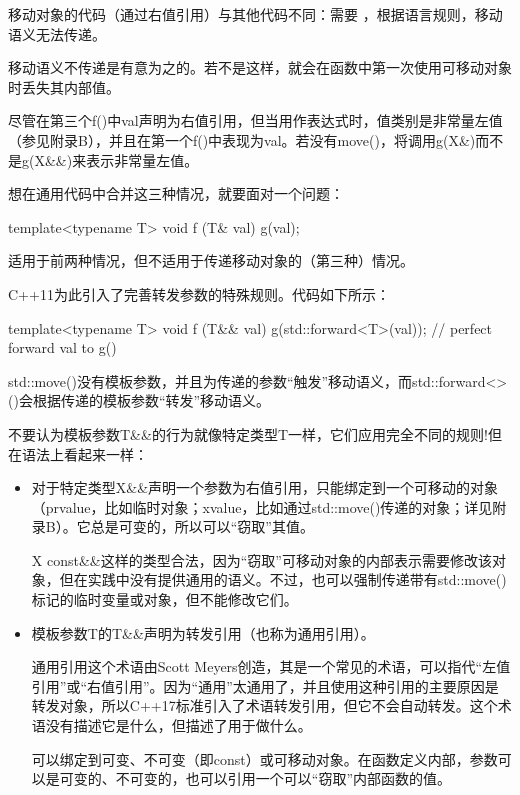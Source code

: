 移动对象的代码（通过右值引用）与其他代码不同：需要 ，根据语言规则，移动语义无法传递。

\begin{notice}
移动语义不传递是有意为之的。若不是这样，就会在函数中第一次使用可移动对象时丢失其内部值。
\end{notice}

尽管在第三个f()中val声明为右值引用，但当用作表达式时，值类别是非常量左值（参见附录B），并且在第一个f()中表现为val。若没有move()，将调用g(X\&)而不是g(X\&\&)来表示非常量左值。

想在通用代码中合并这三种情况，就要面对一个问题：

\begin{cpp}
template<typename T>
void f (T& val) {
	g(val);
}
\end{cpp}

适用于前两种情况，但不适用于传递移动对象的（第三种）情况。

C++11为此引入了完善转发参数的特殊规则。代码如下所示：

\begin{cpp}
template<typename T>
void f (T&& val) {
	g(std::forward<T>(val)); // perfect forward val to g()
}
\end{cpp}

std::move()没有模板参数，并且为传递的参数“触发”移动语义，而std::forward<>()会根据传递的模板参数“转发”移动语义。

不要认为模板参数T\&\&的行为就像特定类型T一样，它们应用完全不同的规则!但在语法上看起来一样：

\begin{itemize}
\item 
对于特定类型X\&\&声明一个参数为右值引用，只能绑定到一个可移动的对象（prvalue，比如临时对象；xvalue，比如通过std::move()传递的对象；详见附录B）。它总是可变的，所以可以“窃取”其值。

\begin{notice}
X const\&\&这样的类型合法，因为“窃取”可移动对象的内部表示需要修改该对象，但在实践中没有提供通用的语义。不过，也可以强制传递带有std::move()标记的临时变量或对象，但不能修改它们。
\end{notice}

\item 
模板参数T的T\&\&声明为转发引用（也称为通用引用）。

\begin{notice}
通用引用这个术语由Scott Meyers创造，其是一个常见的术语，可以指代“左值引用”或“右值引用”。因为“通用”太通用了，并且使用这种引用的主要原因是转发对象，所以C++17标准引入了术语转发引用，但它不会自动转发。这个术语没有描述它是什么，但描述了用于做什么。
\end{notice}

可以绑定到可变、不可变（即const）或可移动对象。在函数定义内部，参数可以是可变的、不可变的，也可以引用一个可以“窃取”内部函数的值。
\end{itemize}

